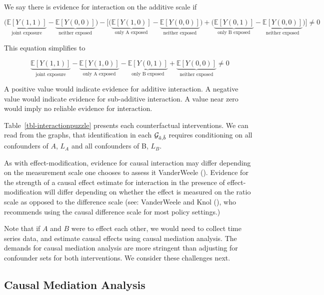 \documentclass[
  single column]{article}
\begin{document}
We say there is evidence for interaction on the additive scale if

\[\bigg(\underbrace{\mathbb{E}[Y(1,1)]}_{\text{joint exposure}} - \underbrace{\mathbb{E}[Y(0,0)]}_{\text{neither exposed}}\bigg) - \bigg[ \bigg(\underbrace{\mathbb{E}[Y(1,0)]}_{\text{only A exposed}} - \underbrace{\mathbb{E}[Y(0,0)]}_{\text{neither exposed}}\bigg) + \bigg(\underbrace{\mathbb{E}[Y(0,1)]}_{\text{only B exposed}} - \underbrace{\mathbb{E}[Y(0,0)]}_{\text{neither exposed}} \bigg)\bigg] \neq 0 \]

This equation simplifies to

\[ \underbrace{\mathbb{E}[Y(1,1)]}_{\text{joint exposure}} - \underbrace{\mathbb{E}[Y(1,0)]}_{\text{only A exposed}} - \underbrace{\mathbb{E}[Y(0,1)]}_{\text{only B exposed}} + \underbrace{\mathbb{E}[Y(0,0)]}_{\text{neither exposed}} \neq 0 \]

A positive value would indicate evidence for additive interaction. A
negative value would indicate evidence for sub-additive interaction. A
value near zero would imply no reliable evidence for interaction.

Table~\ref{tbl-interactionpuzzle} presents each counterfactual
interventions. We can read from the graphs, that identification in each
\(\mathcal{G}_{\Tilde{a}, \Tilde{b}}\) requires conditioning on all
confounders of \(A\), \(L_A\) and all confounders of B, \(L_B\).

As with effect-modification, evidence for causal interaction may differ
depending on the measurement scale one chooses to assess it VanderWeele
(). Evidence for the strength of a
causal effect estimate for interaction in the presence of
effect-modification will differ depending on whether the effect is
measured on the ratio scale as opposed to the difference scale (see:
VanderWeele and Knol (), who
recommends using the causal difference scale for most policy settings.)

Note that if \(A\) and \(B\) were to effect each other, we would need to
collect time series data, and estimate causal effects using causal
mediation analysis. The demands for causal mediation analysis are more
stringent than adjusting for confounder sets for both interventions. We
consider these challenges next.

\subsection{Causal Mediation Analysis}\label{causal-mediation-analysis}
\end{document}
